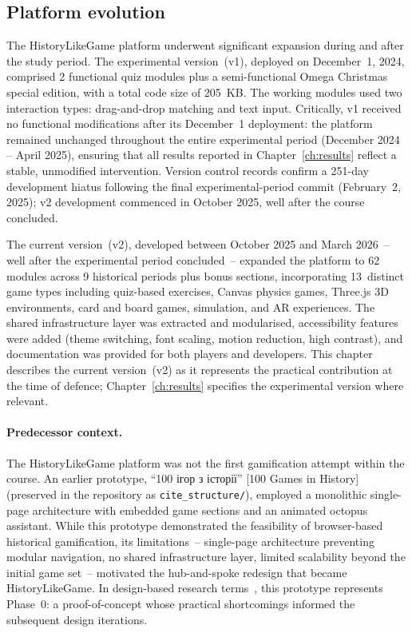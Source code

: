 \subsection{Platform evolution} \label{sec:platform-evolution}

The HistoryLikeGame platform underwent significant expansion during and after the study period. The experimental version~(v1), deployed on December~1, 2024, comprised 2 functional quiz modules plus a semi-functional Omega Christmas special edition, with a total code size of 205~KB. The working modules used two interaction types: drag-and-drop matching and text input. Critically, v1 received no functional modifications after its December~1 deployment: the platform remained unchanged throughout the entire experimental period (December 2024 -- April 2025), ensuring that all results reported in Chapter~\ref{ch:results} reflect a stable, unmodified intervention. Version control records confirm a 251-day development hiatus following the final experimental-period commit (February~2, 2025); v2 development commenced in October 2025, well after the course concluded.

The current version~(v2), developed between October 2025 and March 2026~-- well after the experimental period concluded~-- expanded the platform to 62 modules across 9 historical periods plus bonus sections, incorporating 13~distinct game types including quiz-based exercises, Canvas physics games, Three.js 3D environments, card and board games, simulation, and AR experiences. The shared infrastructure layer was extracted and modularised, accessibility features were added (theme switching, font scaling, motion reduction, high contrast), and documentation was provided for both players and developers. This chapter describes the current version~(v2) as it represents the practical contribution at the time of defence; Chapter~\ref{ch:results} specifies the experimental version where relevant.

\paragraph{Predecessor context.}
The HistoryLikeGame platform was not the first gamification attempt within the course. An earlier prototype, ``\foreignlanguage{ukrainian}{100 ігор з історії}'' [100 Games in History] (preserved in the repository as \texttt{cite\_structure/}), employed a monolithic single-page architecture with embedded game sections and an animated octopus assistant. While this prototype demonstrated the feasibility of browser-based historical gamification, its limitations~-- single-page architecture preventing modular navigation, no shared infrastructure layer, limited scalability beyond the initial game set~-- motivated the hub-and-spoke redesign that became HistoryLikeGame. In design-based research terms~\cite{Adams2022119, WangHannafin2005}, this prototype represents Phase~0: a proof-of-concept whose practical shortcomings informed the subsequent design iterations.

